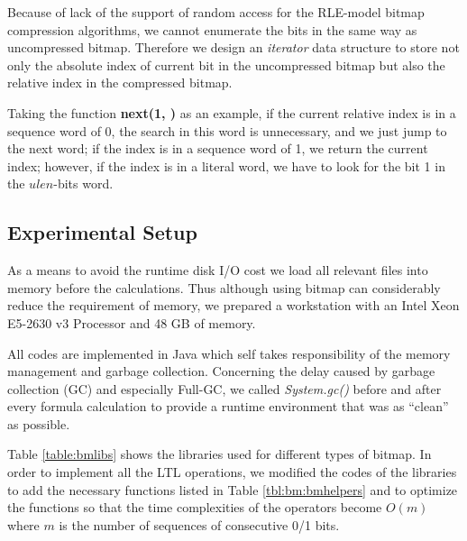 Because of lack of the support of random access for the RLE-model bitmap compression algorithms, we cannot enumerate the bits in the same way as uncompressed bitmap. Therefore we design an \emph{iterator} data structure to store not only the absolute index of current bit in the uncompressed bitmap but also the relative index in the compressed bitmap.

Taking the function \textbf{next(1, )} as an example, if the current relative index is in a sequence word of 0, the search in this word is unnecessary, and we just jump to the next word; if the index is in a sequence word of 1, we return the current index; however, if the index is in a literal word, we have to look for the bit 1 in the $ulen$-bits word.


\subsection{Experimental Setup} %

As a means to avoid the runtime disk I/O cost we load all relevant files into memory before the calculations. Thus although using bitmap can considerably reduce the requirement of memory, we prepared a workstation with an Intel Xeon E5-2630 v3 Processor and 48 GB of memory.

All codes are implemented in Java which self takes responsibility of the memory management and garbage collection. Concerning the delay caused by garbage collection (GC) and especially Full-GC, we called \textit{System.gc()} before and after every formula calculation to provide a runtime environment that was as ``clean'' as possible.

Table \ref{table:bmlibs} shows the libraries used for different types of bitmap. In order to implement all the LTL operations, we modified the codes of the libraries to add the necessary functions listed in Table \ref{tbl:bm:bmhelpers} and to optimize the functions so that the time complexities of the operators become $O(m)$ where $m$ is the number of sequences of consecutive 0/1 bits.

